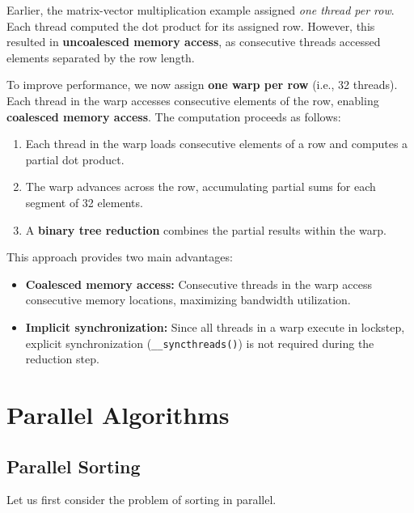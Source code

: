 \documentclass[12pt]{book}
\begin{document}
Earlier, the matrix-vector multiplication example assigned \emph{one thread per row}. Each thread computed the dot product for its assigned row. However, this resulted in \textbf{uncoalesced memory access}, as consecutive threads accessed elements separated by the row length.

To improve performance, we now assign \textbf{one warp per row} (i.e., 32 threads). Each thread in the warp accesses consecutive elements of the row, enabling \textbf{coalesced memory access}. The computation proceeds as follows:

\begin{enumerate}
    \item Each thread in the warp loads consecutive elements of a row and computes a partial dot product.
    \item The warp advances across the row, accumulating partial sums for each segment of 32 elements.
    \item A \textbf{binary tree reduction} combines the partial results within the warp.
\end{enumerate}

This approach provides two main advantages:
\begin{itemize}
    \item \textbf{Coalesced memory access:} Consecutive threads in the warp access consecutive memory locations, maximizing bandwidth utilization.
    \item \textbf{Implicit synchronization:} Since all threads in a warp execute in lockstep, explicit synchronization (\texttt{\_\_syncthreads()}) is not required during the reduction step.
\end{itemize}

























\chapter{Parallel Algorithms}
\section{Parallel Sorting}
Let us first consider the problem of sorting in parallel.
\end{document}
